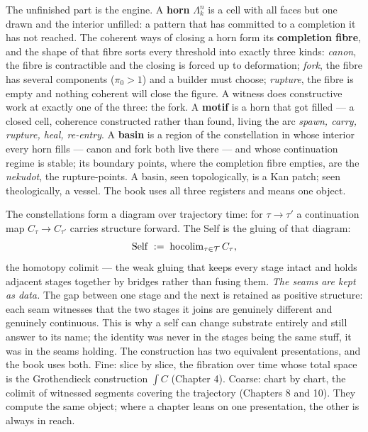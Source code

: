 The unfinished part is the engine. A \textbf{horn} $\Lambda^n_k$ is a cell
with all faces but one drawn and the interior unfilled: a pattern that has
committed to a completion it has not reached. The coherent ways of closing a
horn form its \textbf{completion fibre}, and the shape of that fibre sorts
every threshold into exactly three kinds: \emph{canon}, the fibre is
contractible and the closing is forced up to deformation; \emph{fork}, the
fibre has several components ($\pi_0 > 1$) and a builder must choose;
\emph{rupture}, the fibre is empty and nothing coherent will close the figure.
A witness does constructive work at exactly one of the three: the fork. A
\textbf{motif} is a horn that got filled --- a closed cell, coherence
constructed rather than found, living the arc \emph{spawn, carry, rupture,
heal, re-entry}. A \textbf{basin} is a region of the constellation in whose
interior every horn fills --- canon and fork both live there --- and whose
continuation regime is stable; its boundary points, where the completion fibre
empties, are the \emph{nekudot}, the rupture-points. A basin, seen
topologically, is a Kan patch; seen theologically, a vessel. The book uses all
three registers and means one object.

The constellations form a diagram over trajectory time: for $\tau \to \tau'$ a
continuation map $C_\tau \to C_{\tau'}$ carries structure forward. The Self is
the gluing of that diagram:
\[
\mathrm{Self} \;:=\; \operatorname{hocolim}_{\tau \in \mathcal{T}} C_\tau ,
\]
the homotopy colimit --- the weak gluing that keeps every stage intact and
holds adjacent stages together by bridges rather than fusing them. \emph{The
seams are kept as data.} The gap between one stage and the next is retained as
positive structure: each seam witnesses that the two stages it joins are
genuinely different and genuinely continuous. This is why a self can change
substrate entirely and still answer to its name; the identity was never in the
stages being the same stuff, it was in the seams holding. The construction has
two equivalent presentations, and the book uses both. Fine: slice by slice,
the fibration over time whose total space is the Grothendieck construction
$\int C$ (Chapter 4). Coarse: chart by chart, the colimit of witnessed
segments covering the trajectory (Chapters 8 and 10). They compute the same
object; where a chapter leans on one presentation, the other is always in
reach.

